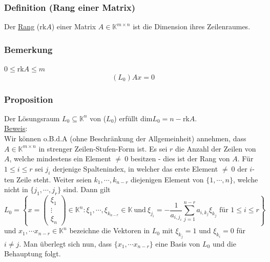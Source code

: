 \subsubsection{Definition (Rang einer Matrix)}
Der \underline{Rang} (rk$A$) einer Matrix $A\in\mathbb{K}^{m\times n}$ ist die Dimension ihres Zeilenraumes.
\subsubsection{Bemerkung}
$0\leq$rk$A\leq m$
\[(L_0) Ax=0\]
\subsubsection{Proposition}
Der Lösungsraum $L_0\subseteq\mathbb{K}^n$ von ($L_0$) erfüllt dim$L_0=n-$rk$A$.\\
\underline{Beweis}:\\
Wir können o.B.d.A (ohne Beschränkung der Allgemeinheit) annehmen, dass $A\in\mathbb{K}^{m\times n}$ in strenger Zeilen-Stufen-Form ist.  Es sei $r$ die Anzahl der Zeilen von $A$, welche mindestens ein Element $\not=\ 0$ besitzen - dies ist der Rang von $A$.  Für $1\leq i\leq r$ sei $j_i$ derjenige Spaltenindex, in welcher das erste Element $\not=\ 0$ der $i$-ten Zeile steht.  Weiter seien $k_1,\cdots ,k_{n-r}$ diejenigen Element von $\{1,\cdots ,n\}$, welche nicht in $\{j_1,\cdots ,j_r\}$ sind.  Dann gilt 
\[L_0=\left\{x=\begin{pmatrix}\xi _1\\ \vdots \\ \xi_n\end{pmatrix}\in\mathbb{K}^n:\xi _1,\cdots ,\xi _{k_{n-r}} \in\mathbb{K}\ \mathrm{und}\ \xi _{j_i}=-\frac{1}{a_{i,j_i}}\sum_{j=1}^{n-r} a_{i,k_j} \xi _{k_j}\text{ für }1\leq i\leq r\right\}\]
und $x_1,\cdots x_{n-r}\in\mathbb{K}^n$ bezeichne die Vektoren in $L_0$ mit $\xi _{k_j}=1$ und $\xi _{k_i}=0$ für $i\not= j$.  Man überlegt sich nun, dass $\{x_1,\cdots x_{n-r}\}$ eine Basis von $L_0$ und die Behauptung folgt.
